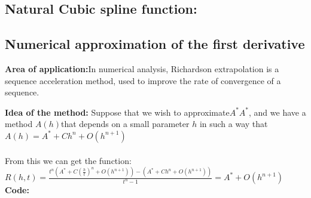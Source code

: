 \documentclass{article}
\begin{document}
	\subsection{Natural Cubic spline function:}
	\subsection{Numerical approximation of the first derivative}
{\bf Area of application:}In numerical analysis, Richardson extrapolation is a sequence acceleration method, used to improve the rate of convergence of a sequence. 

{\bf Idea of the method:} 
Suppose that we wish to approximate$A^* A^* $, and we have a method $
 {\displaystyle A(h)} $that depends on a small parameter $ h $ in such a way that\\
$A ( h ) = A ^ { * } + C h ^ { n } + O \left( h ^ { n + 1 } \right)$\\
\\
From this we can get the function:\\
$R ( h , t ) = \frac { t ^ { n } \left( A ^ { * } + C \left( \frac { h } { t } \right) ^ { n } + O \left( h ^ { n + 1 } \right) \right) - \left( A ^ { * } + C h ^ { n } + O \left( h ^ { n + 1 } \right) \right) } { t ^ { n } - 1 } = A ^ { * } + O \left( h ^ { n + 1 } \right)$
{\\\bf Code:}
\end{document}
